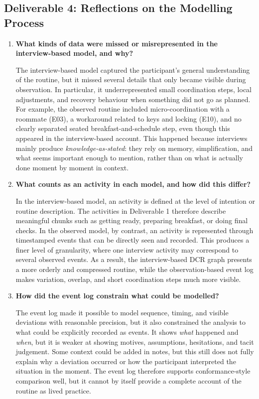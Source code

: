 \subsection{Deliverable 4: Reflections on the Modelling Process}
\label{sec:deliverable4}

\begin{enumerate}
\item \textbf{What kinds of data were missed or misrepresented in the interview-based model, and why?}

The interview-based model captured the participant's general understanding of the routine, but it missed several details that only became visible during observation. In particular, it underrepresented small coordination steps, local adjustments, and recovery behaviour when something did not go as planned. For example, the observed routine included micro-coordination with a roommate (E03), a workaround related to keys and locking (E10), and no clearly separated seated breakfast-and-schedule step, even though this appeared in the interview-based account. This happened because interviews mainly produce \textit{knowledge-as-stated}: they rely on memory, simplification, and what seems important enough to mention, rather than on what is actually done moment by moment in context.

\item \textbf{What counts as an activity in each model, and how did this differ?}

In the interview-based model, an activity is defined at the level of intention or routine description. The activities in Deliverable 1 therefore describe meaningful chunks such as getting ready, preparing breakfast, or doing final checks. In the observed model, by contrast, an activity is represented through timestamped events that can be directly seen and recorded. This produces a finer level of granularity, where one interview activity may correspond to several observed events. As a result, the interview-based DCR graph presents a more orderly and compressed routine, while the observation-based event log makes variation, overlap, and short coordination steps much more visible.

\item \textbf{How did the event log constrain what could be modelled?}

The event log made it possible to model sequence, timing, and visible deviations with reasonable precision, but it also constrained the analysis to what could be explicitly recorded as events. It shows \textit{what} happened and \textit{when}, but it is weaker at showing motives, assumptions, hesitations, and tacit judgement. Some context could be added in notes, but this still does not fully explain why a deviation occurred or how the participant interpreted the situation in the moment. The event log therefore supports conformance-style comparison well, but it cannot by itself provide a complete account of the routine as lived practice.


\end{enumerate}
